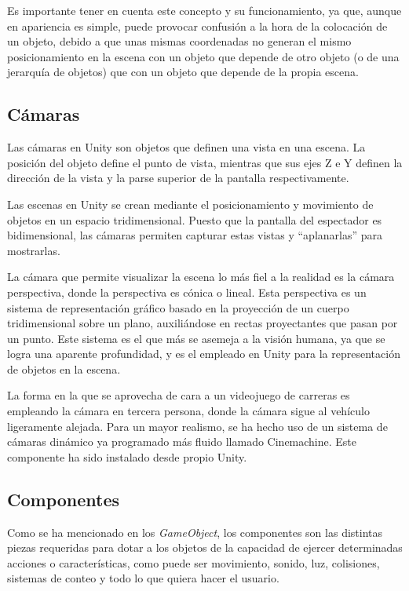 Es importante tener en cuenta este concepto y su funcionamiento, ya que, aunque en apariencia es simple, puede provocar confusión a la hora de la colocación de un objeto, debido a que unas mismas coordenadas no generan el mismo posicionamiento en la escena con un objeto que depende de otro objeto (o de una jerarquía de objetos) que con un objeto que depende de la propia escena.

\subsection{Cámaras}

Las cámaras en Unity son objetos que definen una vista en una escena. La posición del objeto define el punto de vista, mientras que sus ejes Z e Y definen la dirección de la vista y la parse superior de la pantalla respectivamente. 

Las escenas en Unity se crean mediante el posicionamiento y movimiento de objetos en un espacio tridimensional. Puesto que la pantalla del espectador es bidimensional, las cámaras permiten capturar estas vistas y ``aplanarlas'' para mostrarlas.

La cámara que permite visualizar la escena lo más fiel a la realidad es la cámara perspectiva, donde la perspectiva es cónica o lineal. Esta perspectiva es un sistema de representación gráfico basado en la proyección de un cuerpo tridimensional sobre un plano, auxiliándose en rectas proyectantes que pasan por un punto. Este sistema es el que más se asemeja a la visión humana, ya que se logra una aparente profundidad, y es el empleado en Unity para la representación de objetos en la escena.

La forma en la que se aprovecha de cara a un videojuego de carreras es empleando la cámara en tercera persona, donde la cámara sigue al vehículo ligeramente alejada. Para un mayor realismo, se ha hecho uso de un sistema de cámaras dinámico ya programado más fluido llamado Cinemachine. Este componente ha sido instalado desde propio Unity.

\subsection{Componentes}

Como se ha mencionado en los \textit{GameObject}, los componentes son las distintas piezas requeridas para dotar a los objetos de la capacidad de ejercer determinadas acciones o características, como puede ser movimiento, sonido, luz, colisiones, sistemas de conteo y todo lo que quiera hacer el usuario.

